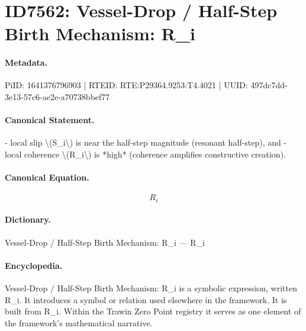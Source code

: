 \section*{ID7562: Vessel-Drop / Half-Step Birth Mechanism: R\_i}
\paragraph{Metadata.}
PiID: 1641376796903 | RTEID: RTE:P29364.9253:T4.4021 | UUID: 497dc7dd-3e13-57c6-ae2e-a70738bbef77

\paragraph{Canonical Statement.}
- local slip \textbackslash{}(S\_i\textbackslash{}) is near the half-step magnitude (resonant half-step), and - local coherence \textbackslash{}(R\_i\textbackslash{}) is *high* (coherence amplifies constructive creation).

\paragraph{Canonical Equation.}
\[
R_i
\]

\paragraph{Dictionary.}
Vessel-Drop / Half-Step Birth Mechanism: R\_i — R\_i

\paragraph{Encyclopedia.}
Vessel-Drop / Half-Step Birth Mechanism: R\_i is a symbolic expression, written R\_i. It introduces a symbol or relation used elsewhere in the framework. It is built from R\_i. Within the Trawin Zero Point registry it serves as one element of the framework's mathematical narrative.
